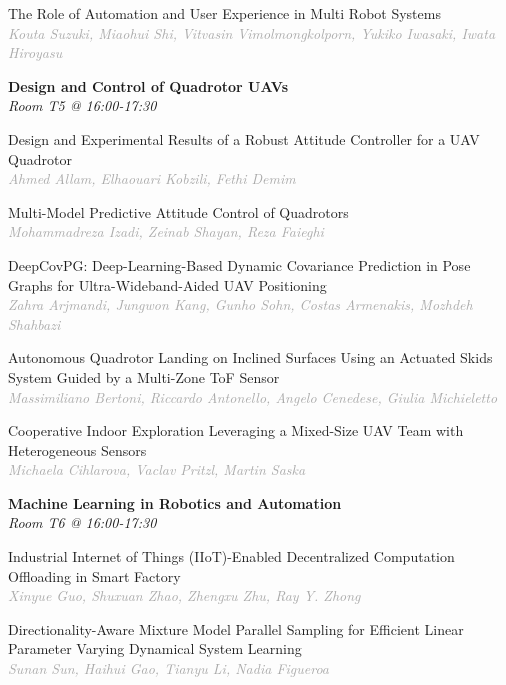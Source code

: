 \begin{multicols*}{2}
\small The Role of Automation and User Experience in Multi Robot Systems\\ 
\footnotesize \textcolor{darkgray}{\textit{Kouta Suzuki, Miaohui  Shi, Vitvasin  Vimolmongkolporn, Yukiko  Iwasaki, Iwata  Hiroyasu}}

\normalsize \textbf{Design and Control of Quadrotor UAVs}\\
\small \textit{Room T5 @ 16:00-17:30}

\small Design and Experimental Results of a Robust Attitude Controller for a UAV Quadrotor\\ 
\footnotesize \textcolor{darkgray}{\textit{Ahmed Allam, Elhaouari  Kobzili, Fethi  Demim}}

\small Multi-Model Predictive Attitude Control of Quadrotors\\ 
\footnotesize \textcolor{darkgray}{\textit{Mohammadreza Izadi, Zeinab  Shayan, Reza  Faieghi}}

\small DeepCovPG: Deep-Learning-Based Dynamic Covariance Prediction in Pose Graphs for Ultra-Wideband-Aided UAV Positioning\\ 
\footnotesize \textcolor{darkgray}{\textit{Zahra Arjmandi, Jungwon  Kang, Gunho  Sohn, Costas  Armenakis, Mozhdeh  Shahbazi}}

\small Autonomous Quadrotor Landing on Inclined Surfaces Using an Actuated Skids System Guided by a Multi-Zone ToF Sensor\\ 
\footnotesize \textcolor{darkgray}{\textit{Massimiliano Bertoni, Riccardo  Antonello, Angelo  Cenedese, Giulia  Michieletto}}

\small Cooperative Indoor Exploration Leveraging a Mixed-Size UAV Team with Heterogeneous Sensors\\ 
\footnotesize \textcolor{darkgray}{\textit{Michaela Cihlarova, Vaclav  Pritzl, Martin  Saska}}

\normalsize \textbf{Machine Learning in Robotics and Automation}\\
\small \textit{Room T6 @ 16:00-17:30}

\small Industrial Internet of Things (IIoT)-Enabled Decentralized Computation Offloading in Smart Factory\\ 
\footnotesize \textcolor{darkgray}{\textit{Xinyue Guo, Shuxuan  Zhao, Zhengxu  Zhu, Ray Y.  Zhong}}

\small Directionality-Aware Mixture Model Parallel Sampling for Efficient Linear Parameter Varying Dynamical System Learning\\ 
\footnotesize \textcolor{darkgray}{\textit{Sunan Sun, Haihui  Gao, Tianyu  Li, Nadia  Figueroa}}


\end{multicols*}
